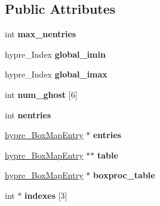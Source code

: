 \subsection*{Public Attributes}
\begin{DoxyCompactItemize}
\item 
\hypertarget{structhypre__BoxMap_a19618550007e0a6e08e5f2494d9b608f}{}int {\bfseries max\+\_\+nentries}\label{structhypre__BoxMap_a19618550007e0a6e08e5f2494d9b608f}

\item 
\hypertarget{structhypre__BoxMap_ae72da060c1f2b33d6cb9cb7786506428}{}hypre\+\_\+\+Index {\bfseries global\+\_\+imin}\label{structhypre__BoxMap_ae72da060c1f2b33d6cb9cb7786506428}

\item 
\hypertarget{structhypre__BoxMap_a066a83464b83356de58e61670c893d3b}{}hypre\+\_\+\+Index {\bfseries global\+\_\+imax}\label{structhypre__BoxMap_a066a83464b83356de58e61670c893d3b}

\item 
\hypertarget{structhypre__BoxMap_a6c38c55629da289b843cde4a338a8a5e}{}int {\bfseries num\+\_\+ghost} \mbox{[}6\mbox{]}\label{structhypre__BoxMap_a6c38c55629da289b843cde4a338a8a5e}

\item 
\hypertarget{structhypre__BoxMap_a5e0e8f3d3213fc795cc6eb1510b95ff4}{}int {\bfseries nentries}\label{structhypre__BoxMap_a5e0e8f3d3213fc795cc6eb1510b95ff4}

\item 
\hypertarget{structhypre__BoxMap_a4623b89082386f6e2cc20db3b5ac9c7c}{}\hyperlink{structhypre__BoxMapEntry__struct}{hypre\+\_\+\+Box\+Map\+Entry} $\ast$ {\bfseries entries}\label{structhypre__BoxMap_a4623b89082386f6e2cc20db3b5ac9c7c}

\item 
\hypertarget{structhypre__BoxMap_a542253d11e1928a9c244c73cd95f5c2a}{}\hyperlink{structhypre__BoxMapEntry__struct}{hypre\+\_\+\+Box\+Map\+Entry} $\ast$$\ast$ {\bfseries table}\label{structhypre__BoxMap_a542253d11e1928a9c244c73cd95f5c2a}

\item 
\hypertarget{structhypre__BoxMap_ac04b3a43fd169d54add1ed421a6b75c1}{}\hyperlink{structhypre__BoxMapEntry__struct}{hypre\+\_\+\+Box\+Map\+Entry} $\ast$ {\bfseries boxproc\+\_\+table}\label{structhypre__BoxMap_ac04b3a43fd169d54add1ed421a6b75c1}

\item 
\hypertarget{structhypre__BoxMap_a187e3befa0bc73c5b69581f2a66ced29}{}int $\ast$ {\bfseries indexes} \mbox{[}3\mbox{]}\label{structhypre__BoxMap_a187e3befa0bc73c5b69581f2a66ced29}


\end{DoxyCompactItemize}
